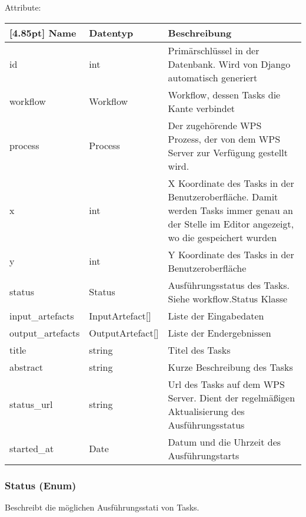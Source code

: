     		Attribute:
			\begin{center}
				\setlength\tabcolsep{5pt}
				\renewcommand{\arraystretch}{1.5}
				
				\begin{tabularx}{\textwidth}{|l|l|X|}
					\hline
					\rowcolor[gray]{0.75}[4.85pt]
					Name & Datentyp & Beschreibung \\ \hline 
	           		id & int & Primärschlüssel in der Datenbank. Wird von Django automatisch generiert \\ \hline
	           		workflow & Workflow & Workflow, dessen Tasks die Kante verbindet \\ \hline
	           		process & Process & Der zugehörende WPS Prozess, der von dem WPS Server zur Verfügung gestellt wird. \\\hline
	           		x & int & X Koordinate des Tasks in der Benutzeroberfläche. Damit werden Tasks immer genau an der Stelle im Editor angezeigt, wo die gespeichert wurden\\ \hline
	           		y & int & Y Koordinate des Tasks in der Benutzeroberfläche\\ \hline
	           		status & Status & Ausführungsstatus des Tasks. Siehe workflow.Status Klasse \\ \hline
	           		input\_artefacts & InputArtefact[] & Liste der Eingabedaten \\ \hline
	           		output\_artefacts & OutputArtefact[] & Liste der Endergebnissen \\ \hline
	           		title & string & Titel des Tasks \\ \hline
	           		abstract & string & Kurze Beschreibung des Tasks \\ \hline
	           		status\_url & string & Url des Tasks auf dem WPS Server. Dient der  regelmäßigen Aktualisierung des Ausführungsstatus \\ \hline
	           		started\_at & Date & Datum und die Uhrzeit des Ausführungstarts \\ \hline
				\end{tabularx}
			\end{center}			
		\subsubsection{Status (Enum)}	
			Beschreibt die möglichen Ausführungsstati von Tasks. \newline
			
